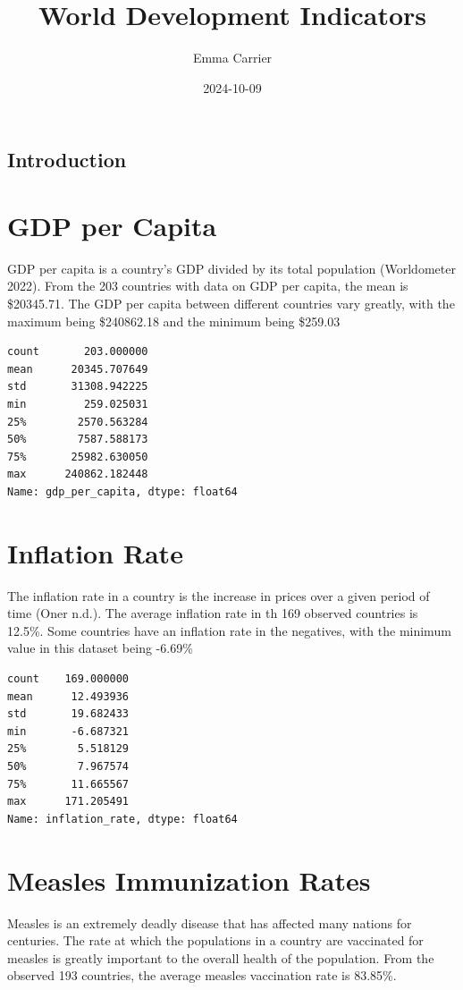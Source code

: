 \documentclass[
  letterpaper,
  DIV=11,
  numbers=noendperiod]{scrartcl}
\title{World Development Indicators}
\author{Emma Carrier}
\date{2024-10-09}
\begin{document}
\maketitle


\subsection{Introduction}\label{introduction}

\section{GDP per Capita}\label{gdp-per-capita}

GDP per capita is a country's GDP divided by its total population
(Worldometer 2022). From the 203 countries with data on GDP per capita,
the mean is \$20345.71. The GDP per capita between different countries
vary greatly, with the maximum being \$240862.18 and the minimum being
\$259.03

\begin{verbatim}
count       203.000000
mean      20345.707649
std       31308.942225
min         259.025031
25%        2570.563284
50%        7587.588173
75%       25982.630050
max      240862.182448
Name: gdp_per_capita, dtype: float64
\end{verbatim}

\section{Inflation Rate}\label{inflation-rate}

The inflation rate in a country is the increase in prices over a given
period of time (Oner n.d.). The average inflation rate in th 169
observed countries is 12.5\%. Some countries have an inflation rate in
the negatives, with the minimum value in this dataset being -6.69\%

\begin{verbatim}
count    169.000000
mean      12.493936
std       19.682433
min       -6.687321
25%        5.518129
50%        7.967574
75%       11.665567
max      171.205491
Name: inflation_rate, dtype: float64
\end{verbatim}

\section{Measles Immunization Rates}\label{measles-immunization-rates}

Measles is an extremely deadly disease that has affected many nations
for centuries. The rate at which the populations in a country are
vaccinated for measles is greatly important to the overall health of the
population. From the observed 193 countries, the average measles
vaccination rate is 83.85\%.
\end{document}
